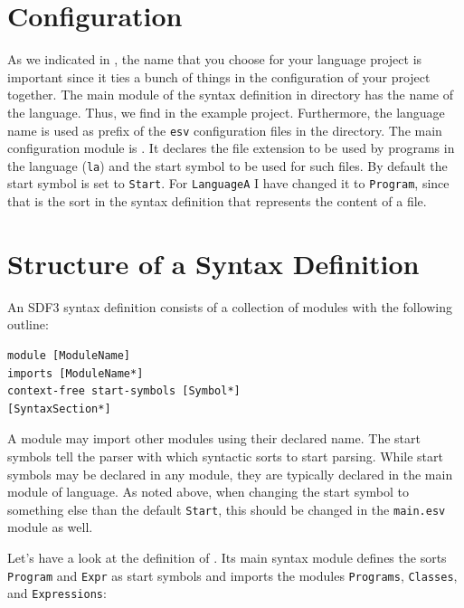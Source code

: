 \section{Configuration}

As we indicated in , the name that you choose for your
language project is important since it ties a bunch of things in the
configuration of your project together. The main module of the syntax definition
in directory  has the name of the language.
Thus, we find  in the example
project. Furthermore, the language name is used as prefix of the \texttt{esv}
configuration files in the  directory. The main
configuration module is . It
declares the file extension to be used by programs in the language (\texttt{la})
and the start symbol to be used for such files. By default the start symbol is
set to \texttt{Start}. For \texttt{LanguageA} I have changed it to
\texttt{Program}, since that is the sort in the syntax definition that
represents the content of a file.


\section{Structure of a Syntax Definition}

An SDF3 syntax definition consists of a collection of modules with the following
outline:

\begin{lstlisting}[language=SDF]
module [ModuleName]
imports [ModuleName*]
context-free start-symbols [Symbol*]
[SyntaxSection*]
\end{lstlisting}

A module may import other modules using their declared name. The start symbols
tell the parser with which syntactic sorts to start parsing. While start symbols
may be declared in any module, they are typically declared in the main module of
language. As noted above, when changing the start symbol to something else than
the default \texttt{Start}, this should be changed in the \texttt{main.esv}
module as well.

Let's have a look at the definition of . Its main
syntax module defines the sorts \texttt{Program} and \texttt{Expr} as start
symbols and imports the modules \texttt{Programs}, \texttt{Classes}, and
\texttt{Expressions}:




